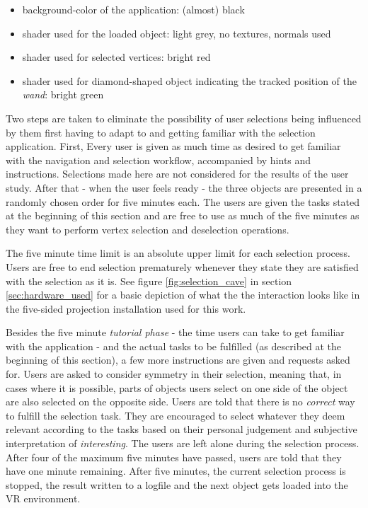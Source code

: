 \begin{itemize}
	\item background-color of the application: (almost) black
	\item shader used for the loaded object: light grey, no textures, normals used
	\item shader used for selected vertices: bright red
	\item shader used for diamond-shaped object indicating the tracked position of the \textit{wand}: bright green
\end{itemize}

Two steps are taken to eliminate the possibility of user selections being influenced by them first having to adapt to and getting familiar with the selection application. First, Every user is given as much time as desired to get familiar with the navigation and selection workflow, accompanied by hints and instructions. Selections made here are not considered for the results of the user study. After that - when the user feels ready - the three objects are presented in a randomly chosen order for five minutes each. The users are given the tasks stated at the beginning of this section and are free to use as much of the five minutes as they want to perform vertex selection and deselection operations.

The five minute time limit is an absolute upper limit for each selection process. Users are free to end selection prematurely whenever they state they are satisfied with the selection as it is. See figure \ref{fig:selection_cave} in section \ref{sec:hardware_used} for a basic depiction of what the the interaction looks like in the five-sided projection installation used for this work.

Besides the five minute \textit{tutorial phase} - the time users can take to get familiar with the application - and the actual tasks to be fulfilled (as described at the beginning of this section), a few more instructions are given and requests asked for. Users are asked to consider symmetry in their selection, meaning that, in cases where it is possible, parts of objects users select on one side of the object are also selected on the opposite side. Users are told that there is no \textit{correct} way to fulfill the selection task. They are encouraged to select whatever they deem relevant according to the tasks based on their personal judgement and subjective interpretation of \textit{interesting}. The users are left alone during the selection process. After four of the maximum five minutes have passed, users are told that they have one minute remaining. After five minutes, the current selection process is stopped, the result written to a logfile and the next object gets loaded into the VR environment. 


